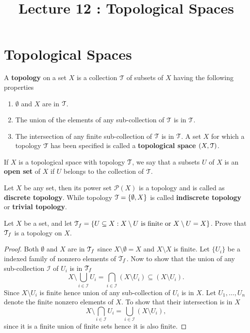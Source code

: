 \documentclass[a4paper,english,12pt]{article}   	%
\title{Lecture 12 : Topological Spaces}
\author{}
\begin{document}
\maketitle
\section{Topological Spaces}
\begin{defn}[Topology] A \textbf{topology} on a set $X$ is a collection $\mathcal{T}$ of subsets of $X$ having the following properties
\begin{enumerate}
\item $\emptyset$ and $X$ are in $\mathcal{T}$.
\item The union of the elements of any sub-collection of $\mathcal{T}$ is in $\mathcal{T}$.
\item The intersection of any finite sub-collection of $\mathcal{T}$ is in $\mathcal{T}$. A set $X$ for which a topology $\mathcal{T}$ has been specified is called a \textbf{topological space $(X,\mathcal{T})$}.
\end{enumerate}
\end{defn}
\begin{defn} If $X$ is a topological space with topology $\mathcal{T}$, we say that a subsets $U$ of $X$ is an \textbf{open set} of $X$ if $U$ belongs to the collection of $\mathcal{T}$.
\end{defn}
\begin{exmp} 
 Let $X$ be any set, then its power set $\mathcal{P}(X)$ is a topology and is called as \textbf{discrete topology}.  While topology $\mathcal{T} =\{\emptyset,X\}$ is called \textbf{indiscrete topology} or \textbf{trivial topology}.
\end{exmp}
\begin{exmp} 
 Let $X$ be a set, and let $\mathcal{T}_f = \{U\subseteq X : X \setminus U\text{ is finite or }X \setminus U= X\}$. Prove that $\mathcal{T}_f$ is a topology on $X$.
 \begin{proof}
  Both $\emptyset$ and $X$ are in $\mathcal{T}_f$ since $X \setminus\emptyset =X$ and $X \setminus X$ is finite. Let $\{U_i\}$ be a indexed family of nonzero elements of $\mathcal{T}_f$. Now to show that the union of any sub-collection $\mathcal{I}$ of $U_i$ is in $\mathcal{T}_f$ $$X\setminus\bigcup_{i\in\mathcal{I}}U_i=\bigcap_{i\in\mathcal{I}}(X\setminus U_i)\subseteq (X\setminus U_i).$$ Since $X\setminus U_i$ is finite hence union of any sub-collection of $U_i$ is in $X$. Let $U_1,\ldots,U_n$ denote the finite nonzero elements of $X$. To show that their intersection is in $X$ $$X\setminus\bigcap_{i\in\mathcal{I}}U_i=\bigcup_{i\in\mathcal{I}}(X\setminus U_i),$$
  since it is a finite union of finite sets hence it is also finite. 
 \end{proof}
 \end{exmp}
 
\end{document}

